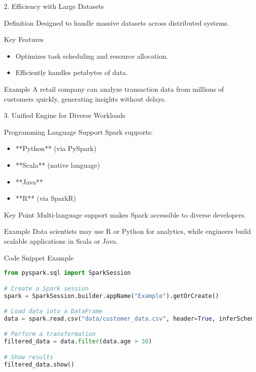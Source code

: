 \documentclass[aspectratio=169]{beamer}
\begin{document}
\begin{frame}{2. Efficiency with Large Datasets}
  \begin{block}{Definition}
    Designed to handle massive datasets across distributed systems.
  \end{block}
  
  \begin{block}{Key Features}
    \begin{itemize}
      \item Optimizes task scheduling and resource allocation.
      \item Efficiently handles petabytes of data.
    \end{itemize}
  \end{block}
  
  \begin{block}{Example}
    A retail company can analyze transaction data from millions of customers quickly, generating insights without delays.
  \end{block}
\end{frame}

\begin{frame}{3. Unified Engine for Diverse Workloads}
  \begin{block}{Programming Language Support}
    Spark supports:
    \begin{itemize}
      \item **Python** (via PySpark)
      \item **Scala** (native language)
      \item **Java**
      \item **R** (via SparkR)
    \end{itemize}
  \end{block}
  
  \begin{block}{Key Point}
    Multi-language support makes Spark accessible to diverse developers.
  \end{block}

  \begin{block}{Example}
    Data scientists may use R or Python for analytics, while engineers build scalable applications in Scala or Java.
  \end{block}
\end{frame}

\begin{frame}[fragile]{Code Snippet Example}
  \begin{lstlisting}[language=Python]
from pyspark.sql import SparkSession

# Create a Spark session
spark = SparkSession.builder.appName("Example").getOrCreate()

# Load data into a DataFrame
data = spark.read.csv("data/customer_data.csv", header=True, inferSchema=True)

# Perform a transformation
filtered_data = data.filter(data.age > 30)

# Show results
filtered_data.show()
  \end{lstlisting}
\end{frame}
\end{document}
